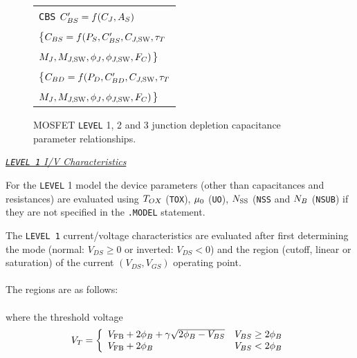 {\begin{figure}
\begin{tabular}[t]{|p{1.8in}|}
{\tt CBS} \hfill $C'_{BS} = f(C_J, A_S)$\\
\{$C_{BS} = f( P_S, C'_{BS}, C_{J,\mbox{\scriptsize SW}}, \tau_T$\hspace*{\fill}\\ \hspace*{\fill}$ M_J, M_{J,\mbox{\scriptsize SW}},
\phi_J, \phi_{J,{\mbox{\scriptsize SW}}}, F_C)$\}\\
\{$C_{BD} = f( P_D, C'_{BD}, C_{J,\mbox{\scriptsize SW}}, \tau_T$\hspace*{\fill}\\ \hspace*{\fill}$ M_J, M_{J,\mbox{\scriptsize SW}},
\phi_J, \phi_{J,{\mbox{\scriptsize SW}}}, F_C)$\}\\
\hline
\end{tabular}
\caption[MOSFET {\tt LEVEL} 1, 2 and 3 depletion capacitance parameter
relationships]{MOSFET {\tt LEVEL} 1, 2 and 3 junction depletion capacitance parameter
relationships.  \label{level123depletionc}}
\end{figure}
}
\noindent\underline{\sl {\tt LEVEL 1} I/V Characteristics}\\[0.1in]

For the {\tt LEVEL} 1 model the device parameters (other than capacitances and
resistances) are evaluated using $T_{OX}$ ({\tt TOX}), $\mu_0$ ({\tt UO}),
$N_{\mbox{\scriptsize SS}}$ ({\tt NSS} and
$N_B$ ({\tt NSUB}) if they are not specified in the {\tt .MODEL} statement.

The {\tt LEVEL 1} current/voltage characteristics are evaluated after first
determining the mode (normal: $V_{DS} \ge 0$ or inverted:
$V_{DS} < 0$) and the region (cutoff,
linear or saturation) of the current
$(V_{DS}, V_{GS})$ operating point.\\[0.1in]

\\[0.2in]
The regions are as follows:\\[0.1in]
\hspace*{\fill}\\[0.1in]
where the threshold voltage
\begin{equation}
V_{T} = \left\{ \begin{array}{ll}
          V_{\ms{FB}} + \PHI + \GAMMA \sqrt{\PHI - V_{BS}}
               & V_{BS} \ge \PHI \\
          V_{\ms{FB}} + \PHI & V_{BS} < \PHI
          \end{array} \right. %
\end{equation}

